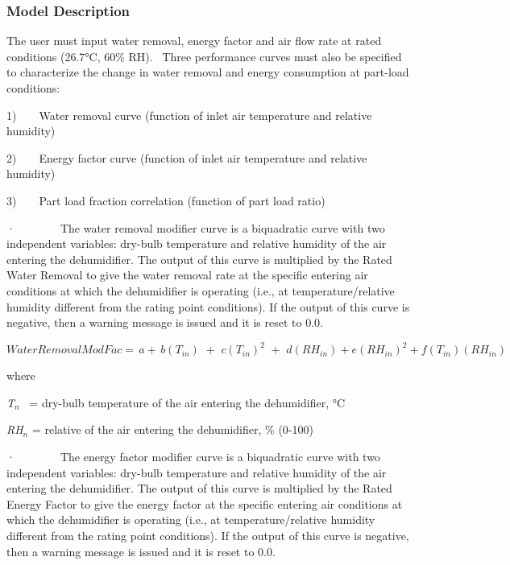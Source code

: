 \subsubsection{Model Description}\label{model-description-2-007}

The user must input water removal, energy factor and air flow rate at rated conditions (26.7°C, 60\% RH).~ Three performance curves must also be specified to characterize the change in water removal and energy consumption at part-load conditions:

1)~~~~Water removal curve (function of inlet air temperature and relative humidity)

2)~~~~Energy factor curve (function of inlet air temperature and relative humidity)

3)~~~~Part load fraction correlation (function of part load ratio)

·~~~~~~~~The water removal modifier curve is a biquadratic curve with two independent variables: dry-bulb temperature and relative humidity of the air entering the dehumidifier. The output of this curve is multiplied by the Rated Water Removal to give the water removal rate at the specific entering air conditions at which the dehumidifier is operating (i.e., at temperature/relative humidity different from the rating point conditions). If the output of this curve is negative, then a warning message is issued and it is reset to 0.0.

\begin{equation}
WaterRemovalModFac = \,a + \,b\left( {{T_{in}}} \right)\,\, + \,\,c{\left( {{T_{in}}} \right)^2}\,\, + \,\,d\left( {R{H_{in}}} \right) + e{(R{H_{in}})^2} + f({T_{in}})(R{H_{in}})
\end{equation}

where

\emph{T\(_{n}\)}~ = dry-bulb temperature of the air entering the dehumidifier, °C

\emph{RH\(_{n}\)} = relative of the air entering the dehumidifier, \% (0-100)

·~~~~~~~~The energy factor modifier curve is a biquadratic curve with two independent variables: dry-bulb temperature and relative humidity of the air entering the dehumidifier. The output of this curve is multiplied by the Rated Energy Factor to give the energy factor at the specific entering air conditions at which the dehumidifier is operating (i.e., at temperature/relative humidity different from the rating point conditions). If the output of this curve is negative, then a warning message is issued and it is reset to 0.0.

